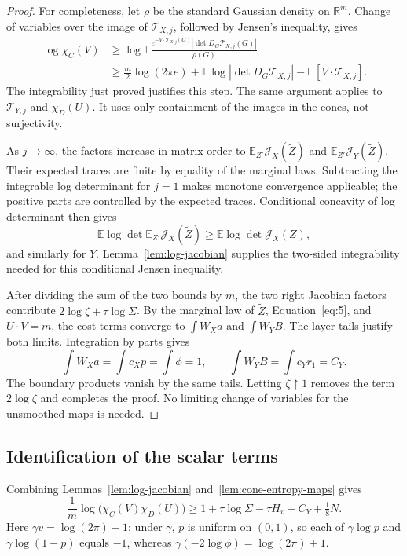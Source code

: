 \begin{proof}
For completeness, let \(\rho\) be the standard Gaussian density on \(\mathbb R^m\). Change of variables over the image of \(\mathcal T_{X,j}\), followed by Jensen's inequality, gives
\[
\begin{aligned}
\log\chi_C(V)
&\ge\log\mathbb E\frac{e^{-V\cdot\mathcal T_{X,j}(G)}
 |\det D_G\mathcal T_{X,j}(G)|}{\rho(G)}\\
&\ge\tfrac m2\log(2\pi e)
+\mathbb E\log|\det D_G\mathcal T_{X,j}|-\mathbb E[V\cdot\mathcal T_{X,j}].
\end{aligned}
\]
The integrability just proved justifies this step. The same argument applies to \(\mathcal T_{Y,j}\) and \(\chi_D(U)\). It uses only containment of the images in the cones, not surjectivity.

As \(j\to\infty\), the factors increase in matrix order to
\(\mathbb E_{Z'}\mathcal J_X(\widetilde Z)\) and
\(\mathbb E_{Z'}\mathcal J_Y(\widetilde Z)\).
Their expected traces are finite by equality of the marginal laws. Subtracting the integrable log determinant for \(j=1\) makes monotone convergence applicable; the positive parts are controlled by the expected traces. Conditional concavity of log determinant \cite{BoydVandenberghe2004} then gives
\[
\mathbb E\log\det\mathbb E_{Z'}\mathcal J_X(\widetilde Z)
\ge\mathbb E\log\det\mathcal J_X(Z),
\]
and similarly for \(Y\). Lemma~\ref{lem:log-jacobian} supplies the two-sided integrability needed for this conditional Jensen inequality.

After dividing the sum of the two bounds by \(m\), the two right Jacobian factors contribute \(2\log\zeta+\tau\log\Sigma\). By the marginal law of \(\widetilde Z\), Equation~\eqref{eq:5}, and \(U\cdot V=m\), the cost terms converge to \(\int W_Xa\) and \(\int W_YB\). The layer tails justify both limits. Integration by parts gives
\[
\int W_Xa=\int c_Xp=\int\phi=1,\qquad
\int W_YB=\int c_Yr_1=C_Y.
\]
The boundary products vanish by the same tails. Letting \(\zeta\uparrow1\) removes the term \(2\log\zeta\) and completes the proof. No limiting change of variables for the unsmoothed maps is needed.
\end{proof}

\subsection{Identification of the scalar terms}
Combining Lemmas~\ref{lem:log-jacobian} and~\ref{lem:cone-entropy-maps} gives
\[
\frac1m\log\bigl(\chi_C(V)\chi_D(U)\bigr)
\ge1+\tau\log\Sigma-\tau H_v-C_Y+\tfrac18N.
\]
Here \(\gamma v=\log(2\pi)-1\): under \(\gamma\), \(p\) is uniform on \((0,1)\), so each of \(\gamma\log p\) and \(\gamma\log(1-p)\) equals \(-1\), whereas \(\gamma(-2\log\phi)=\log(2\pi)+1\).

